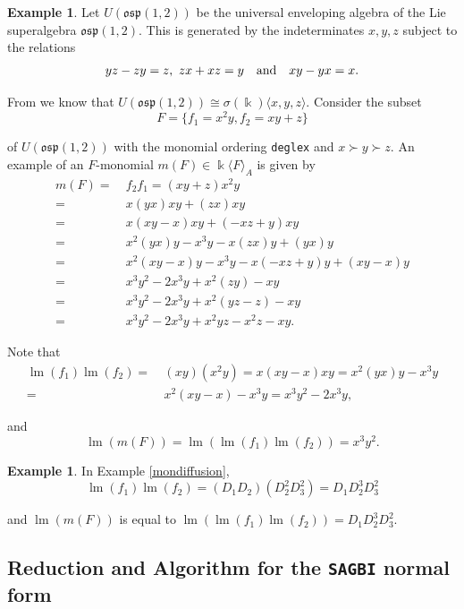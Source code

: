 \documentclass{amsart}
\theoremstyle{definition}
\newtheorem{example}[theorem]{Example}
\theoremstyle{remark}
\numberwithin{equation}{section}
\begin{document}
\begin{example}
Let $U(\mathfrak{osp}(1,2))$ be the universal enveloping algebra of the Lie superalgebra $\mathfrak{osp}(1,2)$. This is generated by the indeterminates $x,y,z$ subject to the relations 
$$
yz - zy = z,\ zx + xz = y \quad  {\rm and} \quad xy - yx = x.
$$

From \cite[p. 1215]{LezamaReyes2014} we know that $U(\mathfrak{osp}(1,2)) \cong \sigma(\Bbbk)\langle x,y,z \rangle$. Consider the subset 
$$
F =\{f_1=x^2y, f_2=xy+z\}
$$ 

of $U(\mathfrak{osp}(1,2))$ with the monomial ordering \texttt{deglex} and $x\succ y\succ z.$ An example of an $F$-monomial $m(F) \in \Bbbk\langle F\rangle_A$ is given by
\begin{align*}
m(F) = &\ f_2f_1 = \left(xy+z\right)x^2y\\ = &\ x(yx)xy+(zx)xy\\ = &\ x(xy-x)xy+(-xz+y)xy\\ = &\ x^2(yx)y-x^3y-x(zx)y+(yx)y\\ = &\ x^2(xy-x)y-x^3y-x(-xz+y)y+(xy-x)y\\ = &\ x^3y^2-2x^3y+x^2(zy)-xy\\ = &\ x^3y^2-2x^3y+x^2(yz-z)-xy\\ = &\ x^3y^2-2x^3y+x^2yz-x^2z-xy.
\end{align*}
	
Note that 
\begin{align*}
   \operatorname{lm}(f_1)\operatorname{lm}(f_2)= &\ (xy)(x^2y)=x(xy-x)xy = x^2(yx)y-x^3y\\
   = &\ x^2(xy-x)-x^3y=x^3y^2-2x^3y,  
\end{align*}

and 
$$\operatorname{lm}(m(F))=\operatorname{lm}\left(\operatorname{lm}\left(f_{ 1}\right) \operatorname{lm}\left(f_{2}\right)\right)=x^3y^2. $$
\end{example}

\begin{example}
In Example \ref{mondiffusion}, 
$$
\operatorname{lm}(f_1)\operatorname{lm}(f_2)=(D_1D_2)(D_2^2D_3^2)=D_1D_2^3D_3^2
$$

and $\operatorname{lm}(m(F))$  is equal to $\operatorname{lm}\left(\operatorname{lm}\left(f_{ 1}\right) \operatorname{lm}\left(f_{2}\right)\right)= D_1D_2^3D_3^2$.
\end{example}


\subsection{Reduction and Algorithm for the \texttt{SAGBI} normal form}
\end{document}
